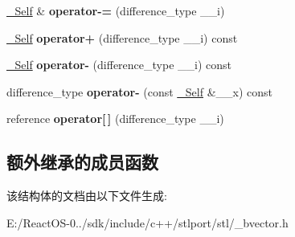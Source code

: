 \begin{DoxyCompactItemize}
$$\hyperlink{struct___bit__iter}{\+\_\+\+Self} \& {\bfseries operator-\/=} (difference\+\_\+type \+\_\+\+\_\+i)
\item 
\mbox{\label{struct___bit__iter_a321a8716003264533ff903ac2d6a91ee}} 
\hyperlink{struct___bit__iter}{\+\_\+\+Self} {\bfseries operator+} (difference\+\_\+type \+\_\+\+\_\+i) const
\item 
\mbox{\label{struct___bit__iter_a9655e7ac6ba1eb4b95b4260903e3884a}} 
\hyperlink{struct___bit__iter}{\+\_\+\+Self} {\bfseries operator-\/} (difference\+\_\+type \+\_\+\+\_\+i) const
\item 
\mbox{\label{struct___bit__iter_aad9814053963e91e8b6532fb154a6063}} 
difference\+\_\+type {\bfseries operator-\/} (const \hyperlink{struct___bit__iter}{\+\_\+\+Self} \&\+\_\+\+\_\+x) const
\item 
\mbox{\label{struct___bit__iter_aa44b21b083439cc53c7e5c6f444c9f1c}} 
reference {\bfseries operator\mbox{[}$\,$\mbox{]}} (difference\+\_\+type \+\_\+\+\_\+i)
\end{DoxyCompactItemize}
\subsection*{额外继承的成员函数}


该结构体的文档由以下文件生成\+:\begin{DoxyCompactItemize}
\item 
E\+:/\+React\+O\+S-\/0../sdk/include/c++/stlport/stl/\+\_\+bvector.\+h\end{DoxyCompactItemize}
